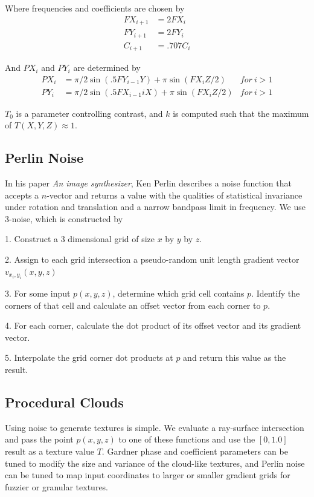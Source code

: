\documentclass[sigconf, nonacm]{acmart}
\begin{document}
Where frequencies and coefficients are chosen by
\begin{align*}
    FX_{i + 1} &= 2FX_i \\
    FY_{i + 1} &= 2FY_i \\
    C_{i + 1} &= .707C_i
\end{align*}

And $PX_i$ and $PY_i$ are determined by
\begin{align*}
    PX_i&=\pi /2\sin (.5FY_{i-1}Y)+\pi \sin(FX_iZ/2)&for\ i > 1\\
    PY_i&=\pi /2\sin (.5FX_{i-1}iX)+\pi \sin(FX_iZ/2)&for\ i >1
\end{align*}

$T_0$ is a parameter controlling contrast, and $k$ is computed such that the maximum of $T(X,Y,Z)\approx1$.

\subsection{Perlin Noise}

In his paper \textit{An image synthesizer}, Ken Perlin describes a noise function that accepts a $n$-vector and returns a value with the qualities of statistical invariance under rotation and translation and a narrow bandpass limit in frequency. We use $3$-noise, which is constructed by

1. Construct a 3 dimensional grid of size $x$ by $y$ by $z$.

2. Assign to each grid intersection a pseudo-random unit length gradient vector $v_{x_i,y_i}(x,y,z)$

3. For some input $p(x,y,z)$, determine which grid cell contains $p$. Identify the corners of that cell and calculate an offset vector from each corner to $p$.

4. For each corner, calculate the dot product of its offset vector and its gradient vector.

5. Interpolate the grid corner dot products at $p$ and return this value as the result.

\subsection{Procedural Clouds}

Using noise to generate textures is simple. We evaluate a ray-surface intersection and pass the point $p(x,y,z)$ to one of these functions and use the $[0, 1.0]$ result as a texture value $T$. Gardner phase and coefficient parameters can be tuned to modify the size and variance of the cloud-like textures, and Perlin noise can be tuned to map input coordinates to larger or smaller gradient grids for fuzzier or granular textures.
\end{document}
